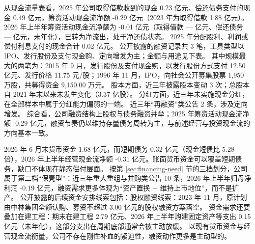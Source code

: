  从现金流量表看，2025 年公司取得借款收到的现金 0.23 亿元、偿还债务支付的现金 0.49 亿元，筹资活动现金流净额 -0.29 亿元（2023 年为取得借款 1.88 亿元）。 2026 年上半年筹资活动现金流净额为 -0.01 亿元（取得借款 — 亿元、偿还债务 — 亿元，未年化），已转为净流出，处于净还债状态。 2025 年分配股利、利润或偿付利息支付的现金合计 0.02 亿元。 公开披露的融资记录共 3 笔，工具类型以 IPO、发行股份及支付现金购、定向增发为主；金额与用途见下表。 其中规模最大的两笔为：2015 年 9 月，发行股份及支付现金购，以发行股份方式支付 12.50 亿元、发行价格 11.75 元/股；1996 年 11 月，IPO，向社会公开募集股票 1,950 万股，共募得资金 9,150.00 万元。 股本方面，近三年披露股本变动 3 次；总股本自 2021 年末以来未发生变化（3.37 亿股）。 分红方面，近三年未实施现金分红，在全部样本中属于分红能力偏弱的一端。 近三年“再融资”类公告 2 条，涉及定向增发。 综合看，公司融资结构上股权与债务融资并举；2025 年筹资活动现金流净额 -0.29 亿元，融资节奏仍以维持存量债务周转为主，与前述经营与投资现金流的方向基本一致。

 2026 年 6 月末货币资金 1.68 亿元，而短期债务 0.32 亿元（现金短债比 5.28 倍），2026 年上半年经营现金流净额 -0.31 亿元。账面货币资金可以覆盖短期债务，缺口不体现在静态偿付层面。 按第 \ref{sec:financing-need} 节的三档划分，公司属于第二档“保壳型”：近三年重大重组与并购类公告 10 条，2026 年上半年归母净利润 -0.19 亿元，融资需求更多体现为“资产置换 + 维持上市地位”，而不是扩产。 公开披露的后续资金安排线索包括：股权融资线索：2023 年 11 月，原计划由中林集团全额认购、募资不超过 3.00 亿元的股权融资方案落空。 资金需求还要叠加在建工程：期末在建工程 2.79 亿元、2026 年上半年购建固定资产等支出 0.15 亿元（未年化），这部分支出在周期底部通常会被主动放缓。 以现有货币资金与经营现金流衡量，公司不存在刚性补血的紧迫性，融资动作更多是主动型的。




